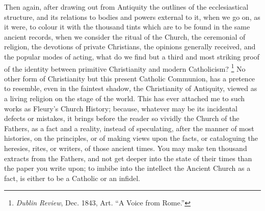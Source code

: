 Then again, after drawing out from Antiquity the outlines of the
ecclesiastical structure, and its relations to bodies and powers
external to it, when we go on, as it were, to colour it with the
thousand tints which are to be found in the same ancient records, when
we consider the ritual of the Church, the ceremonial of religion,
the
devotions of private Christians, the opinions generally received, and
the popular modes of acting, what do we find but a third and most
striking proof of the identity between primitive Christianity and
modern Catholicism? \footnote{\emph{Dublin Review}, Dec. 1843, Art.
``A Voice from Rome.''}
No other form of Christianity but this present Catholic Communion, has
a pretence to resemble, even in the faintest shadow, the Christianity
of Antiquity, viewed as a living religion on the stage of the world.
This has ever attached me to such works as Fleury's Church History;
because, whatever may be its incidental defects or mistakes, it brings
before the reader so vividly the Church of the Fathers, as a fact and
a reality, instead of speculating, after the manner of most histories,
on the principles, or of making views upon the facts, or cataloguing
the heresies, rites, or writers, of those ancient times. You may make
ten thousand extracts from the Fathers, and not get deeper into the
state of their times than the paper you write upon; to imbibe into the
intellect the Ancient Church as a fact, is either to be a Catholic or
an infidel.

